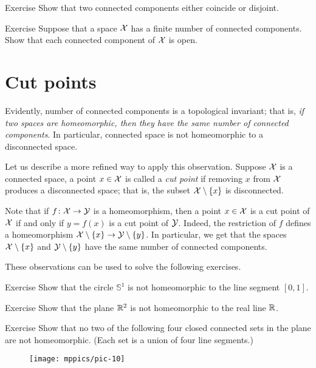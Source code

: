 \begin{thm}{Exercise}\label{ex:connected-component-disjoint}
Show that two connected components either coincide or disjoint.
\end{thm}

\begin{thm}{Exercise}\label{ex:finite-number-connected-component}
Suppose that a space $\mathcal{X}$ has a finite number of connected components.
Show that each connected component of $\mathcal{X}$ is open.
\end{thm}



\section{Cut points}

Evidently, number of connected components is a topological invariant;
that is, \textit{if two spaces are homeomorphic, then they have the same number of connected components}.
In particular, connected space is not homeomorphic to a disconnected space.

Let us describe a more refined way to apply this observation.
Suppose $\mathcal{X}$ is a connected space, a point $x \in\mathcal{X}$ is called a \emph{cut point} if removing $x$ from $\mathcal{X}$ produces a disconnected space;
that is, the subset $\mathcal{X}\setminus\{x\}$ is disconnected.

Note that if $f\colon\mathcal{X}\to \mathcal{Y}$ is a homeomorphism, then a point $x \in\mathcal{X}$ is a cut point of $\mathcal{X}$ if and only if $y=f(x)$ is a cut point of $\mathcal{Y}$.
Indeed, the restriction of $f$ defines a homeomorphism $\mathcal{X}\setminus\{x\}\to \mathcal{Y}\setminus\{y\}$.
In particular, we get that the spaces $\mathcal{X}\setminus\{x\}$ and $\mathcal{Y}\setminus\{y\}$ have the same number of connected components.

These observations can be used to solve the following exercises.

\begin{thm}{Exercise}\label{ex:S1ne[0,1]}
Show that the circle $\mathbb{S}^1$ is not homeomorphic to the line segment $[0,1]$.
\end{thm}

\begin{thm}{Exercise}\label{ex:R2neR}
Show that the plane $\mathbb{R}^2$ is not homeomorphic to the real line $\mathbb{R}$.
\end{thm}

{

\begin{thm}{Exercise}\label{ex:not-homeo}
Show that no two of the following four closed connected sets in the plane are not homeomorphic.
(Each set is a union of four line segments.)

\begin{figure}[!ht]
\centering
\texttt{[image: mppics/pic-10]}
\end{figure}

\end{thm}

}


